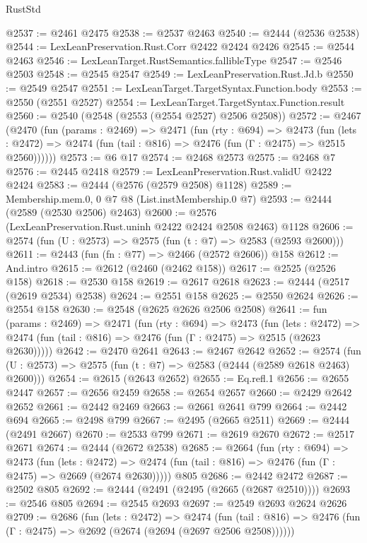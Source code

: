 \begin{lexlean}{RustStd}
\begin{coremodule}
@2537 := @2461 @2475
@2538 := @2537 @2463
@2540 := @2444 (@2536 @2538)
@2544 := LexLeanPreservation.Rust.Corr @2422 @2424 @2426
@2545 := @2544 @2463
@2546 := LexLeanTarget.RustSemantics.fallibleType
@2547 := @2546 @2503
@2548 := @2545 @2547
@2549 := LexLeanPreservation.Rust.Jd.b
@2550 := @2549 @2547
@2551 := LexLeanTarget.TargetSyntax.Function.body
@2553 := @2550 (@2551 @2527)
@2554 := LexLeanTarget.TargetSyntax.Function.result
@2560 := @2540 (@2548 (@2553 (@2554 @2527) @2506 @2508))
@2572 := @2467
    (@2470
      (fun (params : @2469) =>
      @2471
        (fun (rty : @694) =>
        @2473
          (fun (lets : @2472) =>
          @2474 (fun (tail : @816) => @2476 (fun (Γ : @2475) => @2515 @2560))))))
@2573 := @6 @17
@2574 := @2468 @2573
@2575 := @2468 @7
@2576 := @2445 @2418
@2579 := LexLeanPreservation.Rust.validU @2422 @2424
@2583 := @2444 (@2576 (@2579 @2508) @1128)
@2589 := Membership.mem.{0, 0} @7 @8 (List.instMembership.{0} @7)
@2593 := @2444 (@2589 (@2530 @2506) @2463)
@2600 := @2576 (LexLeanPreservation.Rust.uninh @2422 @2424 @2508 @2463) @1128
@2606 := @2574 (fun (U : @2573) => @2575 (fun (t : @7) => @2583 (@2593 @2600)))
@2611 := @2443 (fun (fn : @77) => @2466 (@2572 @2606)) @158
@2612 := And.intro
@2615 := @2612 (@2460 (@2462 @158))
@2617 := @2525 (@2526 @158)
@2618 := @2530 @158
@2619 := @2617 @2618
@2623 := @2444 (@2517 (@2619 @2534) @2538)
@2624 := @2551 @158
@2625 := @2550 @2624
@2626 := @2554 @158
@2630 := @2548 (@2625 @2626 @2506 @2508)
@2641 := fun (params : @2469) =>
  @2471
    (fun (rty : @694) =>
    @2473
      (fun (lets : @2472) =>
      @2474 (fun (tail : @816) => @2476 (fun (Γ : @2475) => @2515 (@2623 @2630)))))
@2642 := @2470 @2641
@2643 := @2467 @2642
@2652 := @2574 (fun (U : @2573) => @2575 (fun (t : @7) => @2583 (@2444 (@2589 @2618 @2463) @2600)))
@2654 := @2615 (@2643 @2652)
@2655 := Eq.refl.{1}
@2656 := @2655 @2447
@2657 := @2656 @2459
@2658 := @2654 @2657
@2660 := @2429 @2642 @2652
@2661 := @2442 @2469
@2663 := @2661 @2641 @799
@2664 := @2442 @694
@2665 := @2498 @799
@2667 := @2495 (@2665 @2511)
@2669 := @2444 (@2491 @2667)
@2670 := @2533 @799
@2671 := @2619 @2670
@2672 := @2517 @2671
@2674 := @2444 (@2672 @2538)
@2685 := @2664
    (fun (rty : @694) =>
    @2473
      (fun (lets : @2472) =>
      @2474 (fun (tail : @816) => @2476 (fun (Γ : @2475) => @2669 (@2674 @2630)))))
    @805
@2686 := @2442 @2472
@2687 := @2502 @805
@2692 := @2444 (@2491 (@2495 (@2665 (@2687 @2510))))
@2693 := @2546 @805
@2694 := @2545 @2693
@2697 := @2549 @2693 @2624 @2626
@2709 := @2686
    (fun (lets : @2472) =>
    @2474
      (fun (tail : @816) => @2476 (fun (Γ : @2475) => @2692 (@2674 (@2694 (@2697 @2506 @2508))))))

\end{coremodule}
\end{lexlean}
